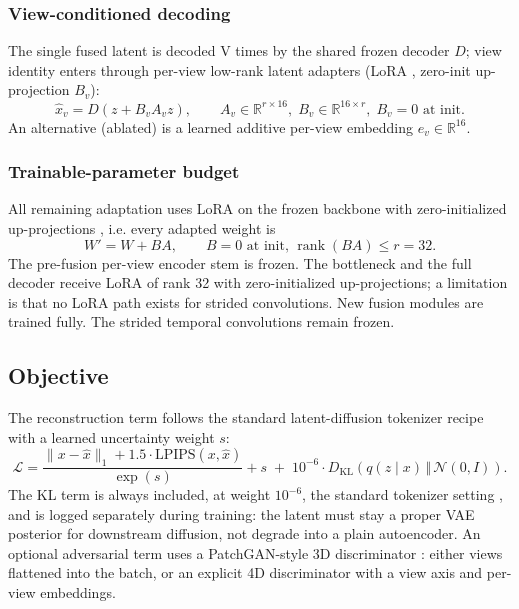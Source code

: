 \subsubsection{View-conditioned decoding}

The single fused latent is decoded V times by the shared frozen decoder $D$; view identity enters through per-view low-rank latent adapters (LoRA \cite{hu2022lora}, zero-init up-projection $B_v$):
\begin{equation}
\hat{x}_v = D\!\left(z + B_v A_v z\right),
\qquad
A_v \in \mathbb{R}^{r \times 16},\; B_v \in \mathbb{R}^{16 \times r},\; B_v = 0 \text{ at init.}
\label{eq:view_decode}
\end{equation}
An alternative (ablated) is a learned additive per-view embedding $e_v \in \mathbb{R}^{16}$.

\subsubsection{Trainable-parameter budget}

All remaining adaptation uses LoRA \cite{hu2022lora} on the frozen backbone with zero-initialized up-projections \cite{zhang2023adding}, i.e. every adapted weight is
\begin{equation}
W' = W + B A, \qquad B = 0 \text{ at init, } \operatorname{rank}(BA) \le r = 32.
\label{eq:lora}
\end{equation}
The pre-fusion per-view encoder stem is frozen. The bottleneck and the full decoder receive LoRA of rank 32 with zero-initialized up-projections; a limitation is that no LoRA path exists for strided convolutions. New fusion modules are trained fully. The strided temporal convolutions remain frozen.

\subsection{Objective}

The reconstruction term follows the standard latent-diffusion tokenizer recipe \cite{rombach2022high, zheng2024opensora} with a learned uncertainty weight $s$:
\begin{equation}
\mathcal{L} =
\frac{\lVert x - \hat{x} \rVert_1 + 1.5 \cdot \mathrm{LPIPS}(x, \hat{x})}{\exp(s)} + s
\;+\; 10^{-6} \cdot D_{\mathrm{KL}}\!\left(q(z \mid x) \,\Vert\, \mathcal{N}(0, I)\right).
\label{eq:objective}
\end{equation}
The KL term is always included, at weight $10^{-6}$, the standard tokenizer setting \cite{rombach2022high}, and is logged separately during training: the latent must stay a proper VAE posterior for downstream diffusion, not degrade into a plain autoencoder. An optional adversarial term uses a PatchGAN-style 3D discriminator \cite{isola2017image}: either views flattened into the batch, or an explicit 4D discriminator with a view axis and per-view embeddings.


